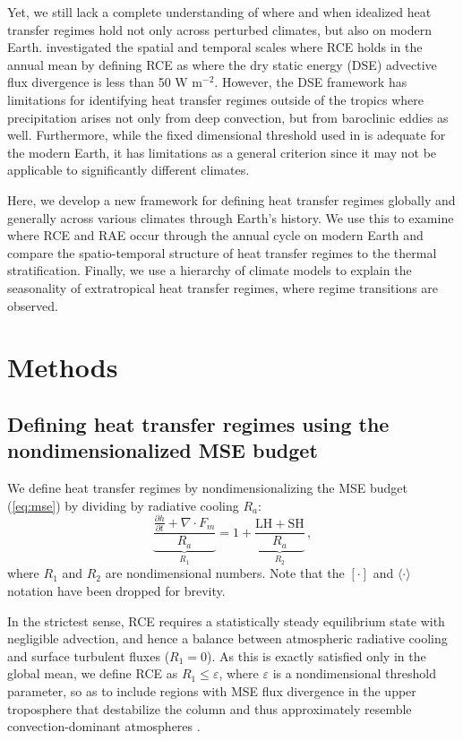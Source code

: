 \documentclass{ametsocV5}
\begin{document}
Yet, we still lack a complete understanding of where and when idealized heat transfer regimes hold not only across perturbed climates, but also on modern Earth. \cite{jakob2019} investigated the spatial and temporal scales where RCE holds in the annual mean by defining RCE as where the dry static energy (DSE) advective flux divergence is less than 50 W m$^{-2}$. However, the DSE framework has limitations for identifying heat transfer regimes outside of the tropics where precipitation arises not only from deep convection, but from baroclinic eddies as well. Furthermore, while the fixed dimensional threshold used in \cite{jakob2019} is adequate for the modern Earth, it has limitations as a general criterion since it may not be applicable to significantly different climates.

Here, we develop a new framework for defining heat transfer regimes globally and generally across various climates through Earth's history. We use this to examine where RCE and RAE occur through the annual cycle on modern Earth and compare the spatio-temporal structure of heat transfer regimes to the thermal stratification. Finally, we use a hierarchy of climate models to explain the seasonality of extratropical heat transfer regimes, where regime transitions are observed.

\section{Methods}\label{sec:methods}

    \subsection{Defining heat transfer regimes using the nondimensionalized MSE budget}

    We define heat transfer regimes by nondimensionalizing the MSE budget (\ref{eq:mse}) by dividing by radiative cooling $R_a$:
    \begin{equation}
        {\underbrace{\frac{\frac{\partial h }{\partial t} + \nabla\cdot F_{m}}{R_{a}}}_{R_1}} = 1 + {\underbrace{\frac{\mathrm{LH+SH}}{R_{a}}}_{R_2}} \, ,
    \end{equation}
    where $R_1$ and $R_2$ are nondimensional numbers. Note that the $[\cdot]$ and $\langle\cdot\rangle$ notation have been dropped for brevity. 
    
    In the strictest sense, RCE requires a statistically steady equilibrium state with negligible advection, and hence a balance between atmospheric radiative cooling and surface turbulent fluxes (\(R_{1}=0\)). As this is exactly satisfied only in the global mean, we define RCE as \(R_{1}\le \varepsilon\), where $\varepsilon$ is a nondimensional threshold parameter, so as to include regions with MSE flux divergence in the upper troposphere that destabilize the column and thus approximately resemble convection-dominant atmospheres \citep{warren2020}.
    
\end{document}
